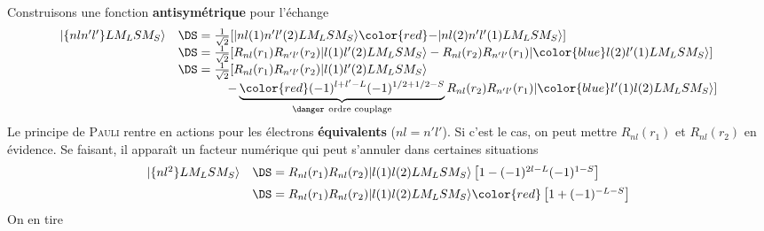 Construisons une fonction \textbf{antisymétrique} pour l'échange
\begin{equation}
\begin{array}{ll}
\vert \{ nl n'l' \} L M_L S M_S \rangle &\DS= 
\frac{1}{\sqrt{2}} [
  \vert nl(1) n'l'(2) L M_L S M_S \rangle
{\color{red} - }
\vert nl(2) n'l'(1) L M_L S M_S \rangle ]\\
&\DS= 
\frac{1}{\sqrt{2}} [R_{nl}(r_1) R_{n'l'}(r_2)
  \vert l(1) l'(2) L M_L S M_S \rangle
-
R_{nl}(r_2) R_{n'l'}(r_1)
\vert {\color{blue} l(2) l'(1) } L M_L S M_S \rangle ]\\
&\DS= 
\frac{1}{\sqrt{2}} [R_{nl}(r_1) R_{n'l'}(r_2)
  \vert l(1) l'(2) L M_L S M_S \rangle\\
  &\qquad\qquad- 
\underbrace{\color{red} (-1)^{l+l'-L}(-1)^{1/2+1/2-S} }_{\danger\ \text{ordre couplage}}
R_{nl}(r_2) R_{n'l'}(r_1)
\vert {\color{blue} l'(1) l(2) }  L M_L S M_S \rangle ]
\end{array}
\end{equation}
Le principe de \textsc{Pauli} rentre en actions pour les électrons \textbf{équivalents} ($nl=n'l'$).
Si c'est le cas, on peut mettre $R_{nl}(r_1)$ et $R_{nl}(r_2)$ en évidence. Se faisant, il apparaît un
facteur numérique qui peut s'annuler dans certaines situations
\begin{equation}
\begin{array}{ll}
\vert \{ nl^2 \} L M_L S M_S \rangle &\DS= 
R_{nl}(r_1) R_{nl}(r_2) \vert  l(1)l(2) L M_L S M_S 
\rangle
\left [ 1 
- (-1)^{2l-L}(-1)^{1-S} \right]\vspace{2mm}\\
&\DS =
R_{nl}(r_1) R_{nl}(r_2) \vert  l(1)l(2) L M_L S M_S 
\rangle
{\color{red} 
\left [ 1 + (-1)^{-L-S} \right] }
\end{array}
\end{equation}
On en tire\\

\ \\

